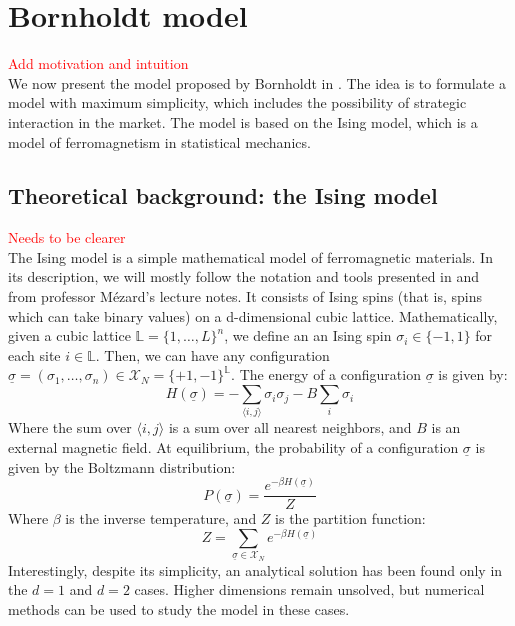 \chapter{Bornholdt model}\label{ch:chapter2}
\textcolor{red}{Add motivation and intuition}\\
We now present the model proposed by Bornholdt in \cite{bornholdt}. The idea is to formulate a model with maximum simplicity, which includes the possibility of strategic interaction in the market. The model is based on the Ising model, which is a model of ferromagnetism in statistical mechanics.

\section{Theoretical background: the Ising model}
\textcolor{red}{Needs to be clearer}\\
The Ising model is a simple mathematical model of ferromagnetic materials. In its description, we will mostly follow the notation and tools presented in \cite{mezard_book} and from professor Mézard's lecture notes. It consists of Ising spins (that is, spins which can take binary values) on a d-dimensional cubic lattice. Mathematically, given a cubic lattice $\mathbb{L}=\{1,\dots,L\}^n$, we define an an Ising spin $\sigma_i\in\{-1,1\}$ for each site $i\in\mathbb{L}$. Then, we can have any configuration $\underline{\sigma} = (\sigma_1,\dots,\sigma_n) \in \mathcal{X}_N=\{+1,-1\}^{\mathbb{L}}$. The energy of a configuration $\underline{\sigma}$ is given by:
\begin{equation}
    H(\underline{\sigma}) = -\sum_{\langle i,j\rangle}\sigma_i\sigma_j - B\sum_i \sigma_i
\end{equation}
Where the sum over $\langle i,j\rangle$ is a sum over all nearest neighbors, and $B$ is an external magnetic field. At equilibrium, the probability of a configuration $\underline{\sigma}$ is given by the Boltzmann distribution:
\begin{equation}
    P(\underline{\sigma}) = \frac{e^{-\beta H(\underline{\sigma})}}{Z}
\end{equation}
Where $\beta$ is the inverse temperature, and $Z$ is the partition function:
\begin{equation}
    Z = \sum_{\underline{\sigma}\in\mathcal{X}_N}e^{-\beta H(\underline{\sigma})}
\end{equation}
Interestingly, despite its simplicity, an analytical solution has been found only in the $d=1$ and $d=2$ cases. Higher dimensions remain unsolved, but numerical methods can be used to study the model in these cases.

